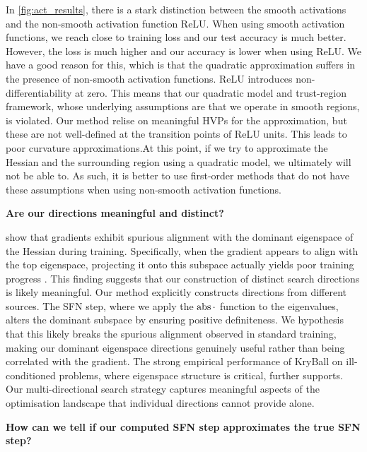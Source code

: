 In \cref{fig:act_results}, there is a stark distinction between the smooth activations and the non-smooth activation function ReLU. When using smooth activation functions, we reach close to training loss and our test accuracy is much better. However, the loss is much higher and our accuracy is lower when using ReLU. We have a good reason for this, which is that the quadratic approximation suffers in the presence of non-smooth activation functions. ReLU introduces non-differentiability at zero. This means that our quadratic model and trust-region framework, whose underlying assumptions are that we operate in smooth regions, is violated. Our method relise on meaningful HVPs for the approximation, but these are not well-defined at the transition points of ReLU units. This leads to poor curvature approximations.At this point, if we try to approximate the Hessian and the surrounding region using a quadratic model, we ultimately will not be able to. As such, it is better to use first-order methods that do not have these assumptions when using non-smooth activation functions. 

\textbf{Are our directions meaningful and distinct?}

\cite{tinysubspaces} show that gradients exhibit spurious alignment with the dominant eigenspace of the Hessian during training. Specifically, when the gradient appears to align with the top eigenspace, projecting it onto this subspace actually yields poor training progress \cite{tinysubspaces}. This finding suggests that our construction of distinct search directions is likely meaningful. Our method explicitly constructs directions from different sources. The SFN step, where we apply the $\operatorname{abs}{\cdot}$ function to the eigenvalues, alters the dominant subspace by ensuring positive definiteness. We hypothesis that this likely breaks the spurious alignment observed in standard training, making our dominant eigenspace directions genuinely useful rather than being correlated with the gradient. The strong empirical performance of KryBall on ill-conditioned problems, where eigenspace structure is critical, further supports. Our multi-directional search strategy captures meaningful aspects of the optimisation landscape that individual directions cannot provide alone.

\textbf{How can we tell if our computed SFN step approximates the true SFN step?}

